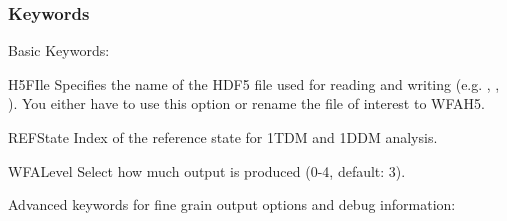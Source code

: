 \subsubsection{Keywords}

Basic Keywords:

\begin{keywordlist}
\item[H5FIle]
Specifies the name of the HDF5 file used for reading and writing
(e.g. , , ).
You either have to use this option or rename the file of
interest to WFAH5.

\item[REFState]
Index of the reference state for 1TDM and 1DDM analysis.

\item[WFALevel]
Select how much output is produced (0-4, default: 3).

\end{keywordlist}

Advanced keywords for fine grain output options and debug information:

